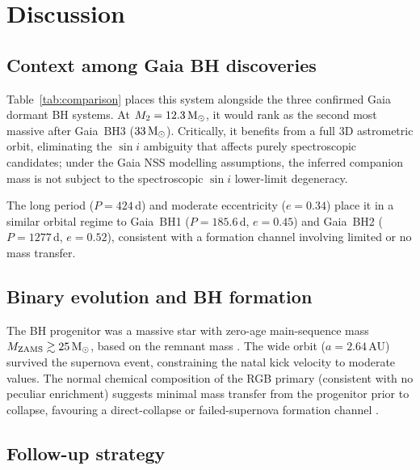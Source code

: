 \documentclass[usenatbib,fleqn]{mnras}
\newcommand{\Msun}{{\rm M}_\odot}
\begin{document}
\section{Discussion}
\label{sec:discussion}

\subsection{Context among Gaia BH discoveries}

Table~\ref{tab:comparison} places this system alongside the three
confirmed Gaia dormant BH systems.  At $M_2 = 12.3\,\Msun$, it
would rank as the second most massive after Gaia~BH3
($33\,\Msun$).  Critically, it benefits from a full 3D astrometric
orbit, eliminating the $\sin i$ ambiguity that affects purely
spectroscopic candidates; under the Gaia NSS modelling assumptions,
the inferred companion mass is not subject to the spectroscopic
$\sin i$ lower-limit degeneracy.

The long period ($P = 424$\,d) and moderate eccentricity
($e = 0.34$) place it in a similar orbital regime to Gaia~BH1
($P = 185.6$\,d, $e = 0.45$) and Gaia~BH2 ($P = 1277$\,d,
$e = 0.52$), consistent with a formation channel involving limited
or no mass transfer.

\subsection{Binary evolution and BH formation}

The BH progenitor was a massive star with zero-age main-sequence
mass $M_{\rm ZAMS} \gtrsim 25\,\Msun$, based on the remnant mass
\citep{Fryer2012}.  The wide orbit ($a = 2.64$\,AU) survived the
supernova event, constraining the natal kick velocity to moderate
values.  The normal chemical composition of the RGB primary
(consistent with no peculiar enrichment) suggests minimal mass
transfer from the progenitor prior to collapse, favouring a
direct-collapse or failed-supernova formation channel
\citep{Langer2020}.

\subsection{Follow-up strategy}
\label{sec:followup}
\end{document}
